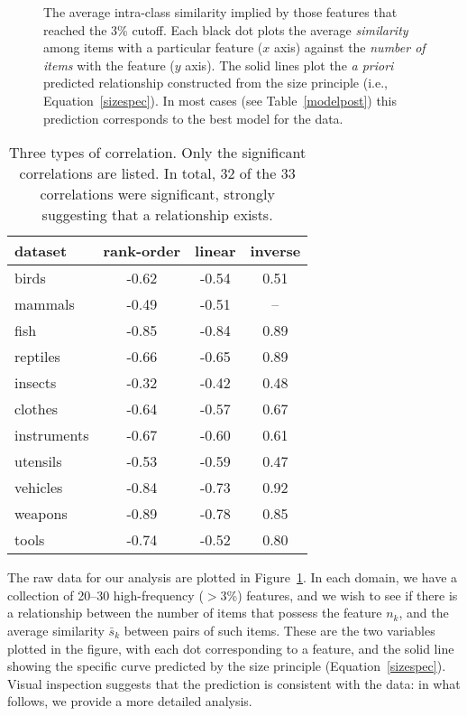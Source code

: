 \documentclass{apa}
\begin{document}
\begin{figure}
\begin{center}
\caption{The average intra-class similarity implied by those features that reached the 3\% cutoff.  Each black dot plots the average {\it similarity} among items with a particular feature ($x$ axis) against the {\it number of items} with the feature ($y$ axis). The solid lines plot the {\it a priori} predicted relationship constructed from the size principle (i.e., Equation~\ref{sizespec}). In most cases (see Table~\ref{modelpost}) this prediction corresponds to the best model for the data.}
\label{sizedata}
\end{center}
\end{figure}



\begin{table}
\begin{center}
\caption{Three types of correlation. Only the significant correlations are listed. In total, 32 of the 33 correlations were significant, strongly suggesting that a relationship exists.}
\label{correls}
\begin{tabular}{l|ccc} \hline dataset & rank-order & linear & inverse \\ \hline
birds      &  {-0.62} & -0.54 & 0.51 \\
mammals    &  -0.49 & {-0.51} & --  \\
fish       &  -0.85 & -0.84 & {0.89} \\
reptiles   &  -0.66 & -0.65 & {0.89} \\
insects    &  -0.32 & -0.42 & {0.48} \\
clothes    &  -0.64 & -0.57 & {0.67} \\
instruments&  {-0.67} & -0.60 & 0.61 \\
utensils   &  -0.53 & {-0.59} & 0.47 \\
vehicles   &  -0.84 & -0.73 & {0.92} \\
weapons    &  {-0.89} & -0.78 & 0.85 \\
tools      &  -0.74 & -0.52 & {0.80} \\
\hline
\end{tabular}
\end{center}
\end{table}



The raw data for our analysis are plotted in Figure~\ref{sizedata}. In each domain, we have a collection of 20--30 high-frequency ($>$3\%) features, and we wish to see if there is a relationship between the number of items that possess the feature $n_k$, and the average similarity $\bar{s}_k$ between pairs of such items. These are the two variables plotted in the figure, with each dot corresponding to a feature, and the solid line showing the specific curve predicted by the size principle (Equation~\ref{sizespec}). Visual inspection suggests that the prediction is consistent with the data: in what follows, we provide a more detailed analysis.
\end{document}
